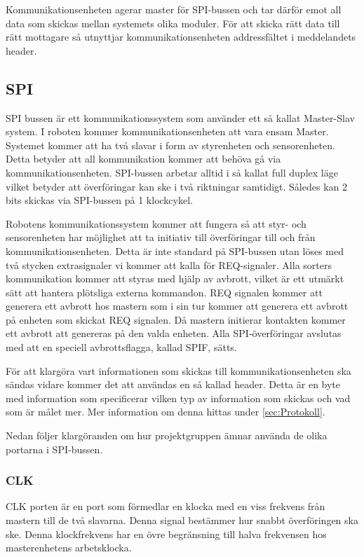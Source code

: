 Kommunikationsenheten agerar master för SPI-bussen och tar därför emot all data
som skickas mellan systemets olika moduler. För att skicka rätt data till rätt
mottagare så utnyttjar kommunikationsenheten addressfältet i meddelandets
header.

\subsection{SPI}
\label{sec:SPI}
SPI bussen är ett kommunikationssystem som använder ett så kallat Master-Slav system. I roboten kommer kommunikationsenheten att vara ensam Master. Systemet kommer att ha två slavar i form av styrenheten och sensorenheten.
Detta betyder att all kommunikation kommer att behöva gå via kommunikationsenheten. SPI-bussen arbetar alltid i så kallat full duplex läge vilket betyder att överföringar kan ske i två riktningar samtidigt. Således kan 2 bits skickas via SPI-bussen på 1 klockcykel. 

Robotens kommunikationssystem kommer att fungera så att styr- och sensorenheten har möjlighet att ta initiativ till överföringar till och från kommunikationsenheten. Detta är inte standard på SPI-bussen utan löses med två stycken extrasignaler vi kommer att kalla för REQ-signaler. Alla sorters kommunikation kommer att styras med hjälp av avbrott, vilket är ett utmärkt sätt att hantera plötsliga externa kommandon. REQ signalen kommer att generera ett avbrott hos mastern som i sin tur kommer att generera ett avbrott på enheten som skickat REQ signalen. Då mastern initierar kontakten kommer ett avbrott att genereras på den valda enheten. Alla SPI-överföringar avslutas med att en speciell avbrottsflagga, kallad SPIF, sätts.

För att klargöra vart informationen som skickas till kommunikationsenheten ska sändas vidare kommer det att användas en så kallad header. Detta är en byte med information som specificerar vilken typ av information som skickas och vad som är målet mer. Mer information om denna hittas under \ref{sec:Protokoll}.

Nedan följer klargöranden om hur projektgruppen ämnar använda de olika portarna i SPI-bussen. 


\subsubsection{CLK}

CLK porten är en port som förmedlar en klocka med en viss frekvens från mastern till de två slavarna. Denna signal bestämmer hur snabbt överföringen ska ske. Denna klockfrekvens har en övre begränsning till halva frekvensen hos masterenhetens arbetsklocka.


